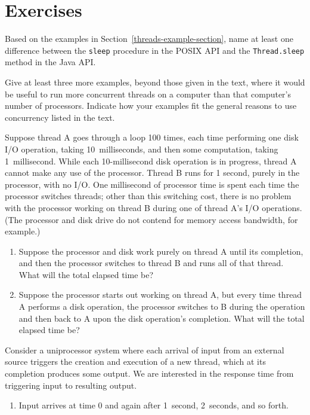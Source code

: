 \section*{Exercises}
\begin{chapterEnumerate}
\item
Based on the examples in Section~\ref{threads-example-section},
name at least one difference between the \verb|sleep| procedure in the
POSIX API and the \verb|Thread.sleep| method in the Java API.
\item
Give at least three more examples, beyond those given in the text,
where it would be useful to run more concurrent threads on a computer
than that computer's number of processors.  Indicate how your examples
fit the general reasons to use concurrency listed in the text.
\item
Suppose thread A goes through a loop 100 times, each time performing
one disk I/O operation, taking 10~milliseconds, and then some computation, taking
1~millisecond.  While each 10-millisecond disk operation is in progress, thread A cannot
make any use of the processor.  Thread B runs for 1 second,
purely in the processor, with no I/O.  One millisecond
of processor time is spent each time the processor switches
threads; other than this switching cost, there is no problem with the
processor working on thread B during one of thread A's I/O operations.  (The
processor and disk drive do not contend for memory access bandwidth,
for example.)
\begin{enumerate}
\item
Suppose the processor and disk work purely on thread A until its
completion, and then the processor switches to thread B and runs all of
that thread.  What will the total elapsed time be?
\item
Suppose the processor starts out working on thread A, but every time
thread A performs a disk operation, the processor switches to B during
the operation and then back to A upon the disk operation's completion.
What will the total elapsed time be?
\end{enumerate}
\item
Consider a uniprocessor system where each arrival of input from an
external source triggers the creation and execution of a new thread,
which at its completion produces some output.  We are interested in
the response time from triggering input to resulting output.
\begin{enumerate}
\item
Input arrives at time 0 and again after 1~second, 2~seconds, and so forth.

\end{enumerate}
\end{chapterEnumerate}
